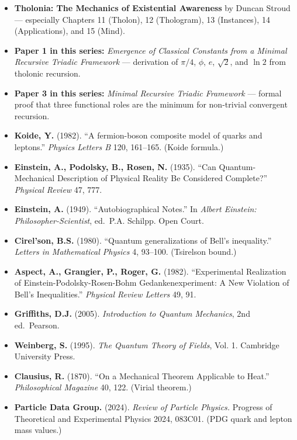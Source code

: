 \documentclass[12pt]{article}
\providecommand{\tightlist}{%
  \setlength{\itemsep}{0pt}\setlength{\parskip}{0pt}}
\begin{document}
\begin{itemize}
\tightlist
\item
  \textbf{Tholonia: The Mechanics of Existential Awareness} by Duncan
  Stroud --- especially Chapters 11 (Tholon), 12 (Thologram), 13
  (Instances), 14 (Applications), and 15 (Mind).
\item
  \textbf{Paper 1 in this series:} \emph{Emergence of Classical
  Constants from a Minimal Recursive Triadic Framework} --- derivation
  of \(\pi/4\), \(\phi\), \(e\), \(\sqrt{2}\), and \(\ln 2\) from
  tholonic recursion.
\item
  \textbf{Paper 3 in this series:} \emph{Minimal Recursive Triadic
  Framework} --- formal proof that three functional roles are the
  minimum for non-trivial convergent recursion.
\item
  \textbf{Koide, Y.} (1982). ``A fermion-boson composite model of quarks
  and leptons.'' \emph{Physics Letters B} 120, 161--165. (Koide
  formula.)
\item
  \textbf{Einstein, A., Podolsky, B., Rosen, N.} (1935). ``Can
  Quantum-Mechanical Description of Physical Reality Be Considered
  Complete?'' \emph{Physical Review} 47, 777.
\item
  \textbf{Einstein, A.} (1949). ``Autobiographical Notes.'' In
  \emph{Albert Einstein: Philosopher-Scientist}, ed.~P.A. Schilpp. Open
  Court.
\item
  \textbf{Cirel'son, B.S.} (1980). ``Quantum generalizations of Bell's
  inequality.'' \emph{Letters in Mathematical Physics} 4, 93--100.
  (Tsirelson bound.)
\item
  \textbf{Aspect, A., Grangier, P., Roger, G.} (1982). ``Experimental
  Realization of Einstein-Podolsky-Rosen-Bohm Gedankenexperiment: A New
  Violation of Bell's Inequalities.'' \emph{Physical Review Letters} 49,
  91.
\item
  \textbf{Griffiths, D.J.} (2005). \emph{Introduction to Quantum
  Mechanics}, 2nd ed.~Pearson.
\item
  \textbf{Weinberg, S.} (1995). \emph{The Quantum Theory of Fields},
  Vol. 1. Cambridge University Press.
\item
  \textbf{Clausius, R.} (1870). ``On a Mechanical Theorem Applicable to
  Heat.'' \emph{Philosophical Magazine} 40, 122. (Virial theorem.)
\item
  \textbf{Particle Data Group.} (2024). \emph{Review of Particle
  Physics.} Progress of Theoretical and Experimental Physics 2024,
  083C01. (PDG quark and lepton mass values.)
\end{itemize}
\end{document}
